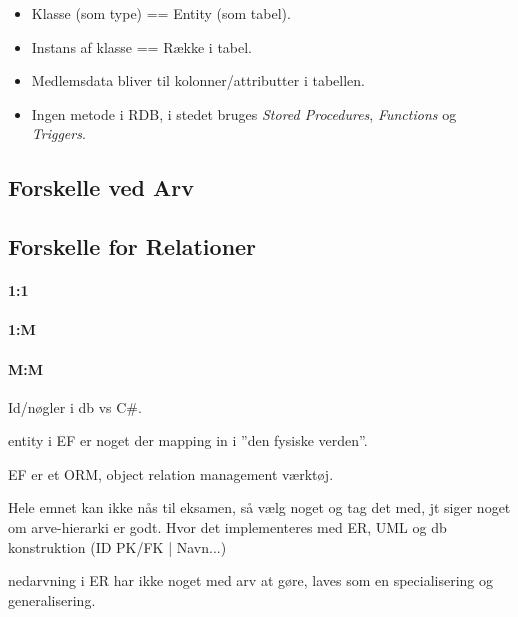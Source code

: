 \begin{itemize}
	\item Klasse (som type) == Entity (som tabel). 
	\item Instans af klasse == Række i tabel.
	\item Medlemsdata bliver til kolonner/attributter i tabellen.
	\item Ingen metode i RDB, i stedet bruges \textit{Stored Procedures}, \textit{Functions} og \textit{Triggers}.
\end{itemize}

\subsection{Forskelle ved Arv}\label{sec:arv}

\subsection{Forskelle for Relationer}

\paragraph{1:1}
\paragraph{1:M}
\paragraph{M:M}

Id/nøgler i db vs C\#. 


entity i EF er noget der mapping in i ''den fysiske verden''.

EF er et ORM, object relation management værktøj.

Hele emnet kan ikke nås til eksamen, så vælg noget og tag det med, jt siger noget om arve-hierarki er godt. Hvor det implementeres med ER, UML og db konstruktion (ID PK/FK | Navn...)

nedarvning i ER har ikke noget med arv at gøre, laves som en specialisering og generalisering.
